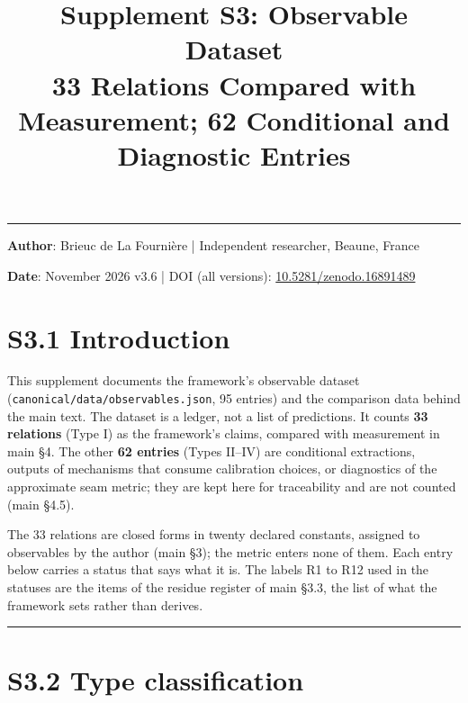 \documentclass[11pt,a4paper]{article}
\title{%
\LARGE\textbf{Supplement S3: Observable Dataset}\\[0.3em]
\large 33 Relations Compared with Measurement; 62 Conditional and Diagnostic Entries%
}
\author{}
\date{}
\begin{document}
\maketitle
\noindent\rule{\textwidth}{0.2pt}

\noindent\textbf{Author}: Brieuc de La Fourni\`ere \quad | \quad Independent researcher, Beaune, France

\noindent\textbf{Date}: November 2026 \quad v3.6 \quad | \quad DOI (all versions): \href{https://doi.org/10.5281/zenodo.16891489}{10.5281/zenodo.16891489}

\thispagestyle{fancy}

\section{S3.1 Introduction}\label{s3.1-introduction}

This supplement documents the framework's observable dataset (\texttt{canonical/\allowbreak{}data/\allowbreak{}observables.\allowbreak{}json}, 95 entries) and the comparison data behind the main text. The dataset is a ledger, not a list of predictions. It counts \textbf{33 relations} (Type I) as the framework's claims, compared with measurement in main §4. The other \textbf{62 entries} (Types II--IV) are conditional extractions, outputs of mechanisms that consume calibration choices, or diagnostics of the approximate seam metric; they are kept here for traceability and are not counted (main §4.5).

The 33 relations are closed forms in twenty declared constants, assigned to observables by the author (main §3); the metric enters none of them. Each entry below carries a status that says what it is. The labels R1 to R12 used in the statuses are the items of the residue register of main §3.3, the list of what the framework sets rather than derives.

\begin{center}\rule{\linewidth}{0.5pt}\end{center}

\section{S3.2 Type classification}\label{s3.2-type-classification}
\end{document}
